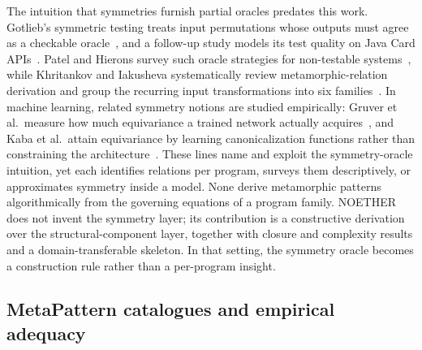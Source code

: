 \documentclass[manuscript]{acmart}
\begin{document}
The intuition that symmetries furnish partial oracles predates this work. Gotlieb's symmetric testing treats input permutations whose outputs must agree as a checkable oracle~\cite{Gotlieb2003Symmetries}, and a follow-up study models its test quality on Java Card APIs~\cite{GotliebBernard2006}. Patel and Hierons survey such oracle strategies for non-testable systems~\cite{PatelHierons2018}, while Khritankov and Iakusheva systematically review metamorphic-relation derivation and group the recurring input transformations into six families~\cite{KhritankovIakusheva2024}. In machine learning, related symmetry notions are studied empirically: Gruver et al.\ measure how much equivariance a trained network actually acquires~\cite{Gruver2023LieDerivative}, and Kaba et al.\ attain equivariance by learning canonicalization functions rather than constraining the architecture~\cite{Kaba2023Canonicalization}. These lines name and exploit the symmetry-oracle intuition, yet each identifies relations per program, surveys them descriptively, or approximates symmetry inside a model. None derive metamorphic patterns algorithmically from the governing equations of a program family. NOETHER does not invent the symmetry layer; its contribution is a constructive derivation over the structural-component layer, together with closure and complexity results and a domain-transferable skeleton. In that setting, the symmetry oracle becomes a construction rule rather than a per-program insight.

\subsection{MetaPattern catalogues and empirical adequacy}
\end{document}
